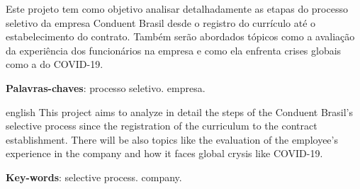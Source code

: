 
\setlength{\absparsep}{18pt} %
\begin{resumo}

Este projeto tem como objetivo analisar detalhadamente as etapas do processo seletivo da empresa Conduent Brasil desde o registro do currículo até o estabelecimento do contrato. Também serão abordados tópicos como a avaliação da experiência dos funcionários na empresa e como ela enfrenta crises globais como a do COVID-19.    


\textbf
{Palavras-chaves}: processo seletivo. empresa.
\end{resumo}

\begin{resumo}[Abstract]
 \begin{otherlanguage*}{english}
  This project aims to analyze in detail the steps of the Conduent Brasil's selective process since the registration of the curriculum to the contract establishment. There will be also topics like the evaluation of the employee's experience in the company and how it faces global crysis like COVID-19.

   \vspace{\onelineskip}
 
   \noindent 
   \textbf{Key-words}: selective process. company.
 \end{otherlanguage*}
\end{resumo}